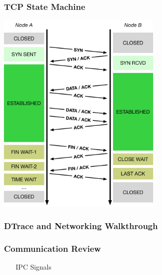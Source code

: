 \documentclass[pdftex]{beamer} %
\begin{document}
\begin{frame}[fragile]
  \frametitle{TCP State Machine}
\centering
\includegraphics[width=0.6\textwidth]{../../figures/tcp-timeline.pdf}
\end{frame}

\begin{frame}
  \frametitle{DTrace and Networking Walkthrough}
  
\end{frame}

\begin{frame}
  \frametitle{Communication Review}
  \begin{enumerate}
  \item [IPC] Signals 
  \end{enumerate}
\end{frame}
\end{document}
